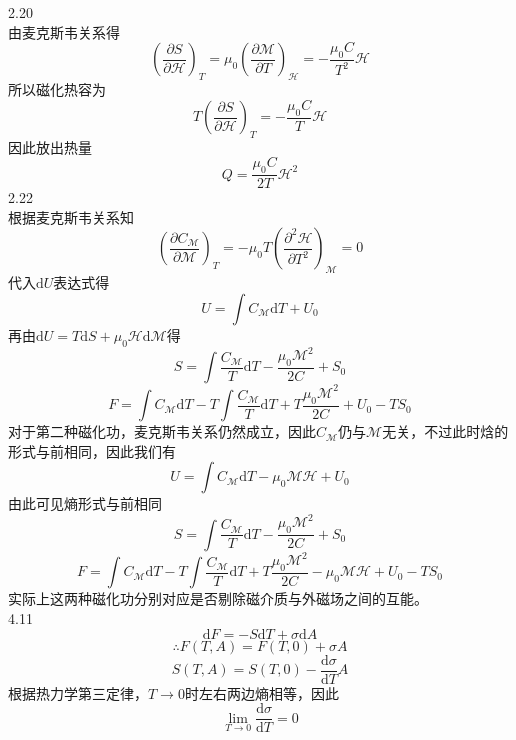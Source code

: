 \documentclass[utf8]{ctexart}
\begin{document}
2.20\\
由麦克斯韦关系得
\[\left(\frac{\partial S}{\partial\mathcal{H}}\right)_T=\mu_0\left(\frac{\partial\mathcal{M}}{\partial T}\right)_\mathcal{H}=-\frac{\mu_0C}{T^2}\mathcal{H}\]
所以磁化热容为
\[T\left(\frac{\partial S}{\partial\mathcal{H}}\right)_T=-\frac{\mu_0C}{T}\mathcal{H}\]
因此放出热量
\[Q=\frac{\mu_0C}{2T}\mathcal{H}^2\]
2.22\\
根据麦克斯韦关系知
\[\left(\frac{\partial C_\mathcal{M}}{\partial\mathcal{M}}\right)_T=-\mu_0T\left(\frac{\partial^2\mathcal{H}}{\partial T^2}\right)_\mathcal{M}=0\]
代入$\mathrm{d}U$表达式得
\[U=\int C_\mathcal{M}\mathrm{d}T+U_0\]
再由$\mathrm{d}U=T\mathrm{d}S+\mu_0\mathcal{H}\mathrm{d}\mathcal{M}$得
\[S=\int\frac{C_\mathcal{M}}{T}\mathrm{d}T-\frac{\mu_0\mathcal{M}^2}{2C}+S_0\]
\[F=\int C_\mathcal{M}\mathrm{d}T-T\int\frac{C_\mathcal{M}}{T}\mathrm{d}T+T\frac{\mu_0\mathcal{M}^2}{2C}+U_0-TS_0\]
对于第二种磁化功，麦克斯韦关系仍然成立，因此$C_\mathcal{M}$仍与$\mathcal{M}$无关，不过此时焓的形式与前相同，因此我们有
\[U=\int C_\mathcal{M}\mathrm{d}T-\mu_0\mathcal{M}\mathcal{H}+U_0\]
由此可见熵形式与前相同
\[S=\int\frac{C_\mathcal{M}}{T}\mathrm{d}T-\frac{\mu_0\mathcal{M}^2}{2C}+S_0\]
\[F=\int C_\mathcal{M}\mathrm{d}T-T\int\frac{C_\mathcal{M}}{T}\mathrm{d}T+T\frac{\mu_0\mathcal{M}^2}{2C}-\mu_0\mathcal{M}\mathcal{H}+U_0-TS_0\]
实际上这两种磁化功分别对应是否剔除磁介质与外磁场之间的互能。\\
4.11\\
\[\mathrm{d}F=-S\mathrm{d}T+\sigma\mathrm{d}A\]
\[\therefore F(T,A)=F(T,0)+\sigma A\]
\[S(T,A)=S(T,0)-\frac{\mathrm{d}\sigma}{\mathrm{d}T}A\]
根据热力学第三定律，$T\rightarrow0$时左右两边熵相等，因此
\[\lim_{T\rightarrow0}\frac{\mathrm{d}\sigma}{\mathrm{d}T}=0\]
\end{document}
